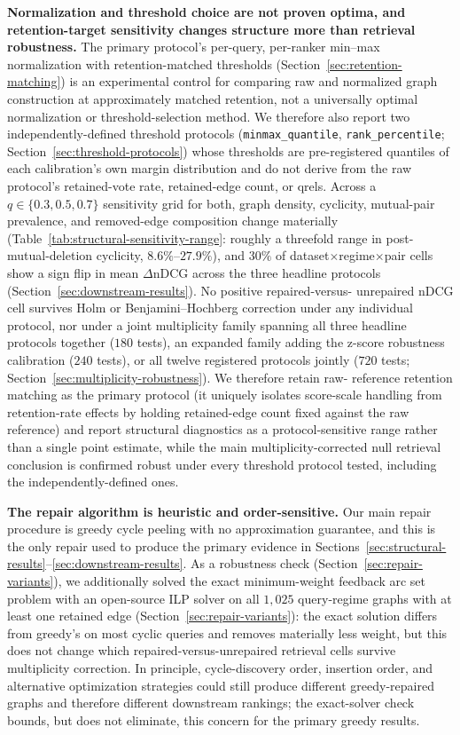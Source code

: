 \documentclass[manuscript,anonymous,review]{acmart}
\begin{document}
\textbf{Normalization and threshold choice are not proven optima, and
retention-target sensitivity changes structure more than retrieval
robustness.} The primary protocol's per-query, per-ranker min--max
normalization with retention-matched thresholds
(Section~\ref{sec:retention-matching}) is an experimental control for
comparing raw and normalized graph construction at approximately matched
retention, not a universally optimal normalization or threshold-selection
method. We therefore also report two independently-defined threshold protocols
(\texttt{minmax\_quantile}, \texttt{rank\_percentile};
Section~\ref{sec:threshold-protocols}) whose thresholds are pre-registered
quantiles of each calibration's own margin distribution and do not derive
from the raw protocol's retained-vote rate, retained-edge count, or qrels.
Across a $q\in\{0.3,0.5,0.7\}$ sensitivity grid for both, graph density,
cyclicity, mutual-pair prevalence, and removed-edge composition change
materially (Table~\ref{tab:structural-sensitivity-range}: roughly a
threefold range in post-mutual-deletion cyclicity, $8.6\%$--$27.9\%$), and
$30\%$ of dataset$\times$regime$\times$pair cells show a sign flip in mean
$\Delta$nDCG across the three headline protocols
(Section~\ref{sec:downstream-results}). No positive repaired-versus-
unrepaired nDCG cell survives Holm or Benjamini--Hochberg correction under
any individual protocol, nor under a joint multiplicity family spanning all
three headline protocols together ($180$ tests), an expanded family adding
the z-score robustness calibration ($240$ tests), or all twelve registered
protocols jointly ($720$ tests;
Section~\ref{sec:multiplicity-robustness}). We therefore retain raw-
reference retention matching as the primary protocol (it uniquely isolates
score-scale handling from retention-rate effects by holding retained-edge
count fixed against the raw reference) and report structural diagnostics as
a protocol-sensitive range rather than a single point estimate, while the
main multiplicity-corrected null retrieval conclusion is confirmed robust
under every threshold protocol tested, including the independently-defined
ones.

\textbf{The repair algorithm is heuristic and order-sensitive.} Our main repair
procedure is greedy cycle peeling with no approximation guarantee, and this is
the only repair used to produce the primary evidence in
Sections~\ref{sec:structural-results}--\ref{sec:downstream-results}. As a
robustness check (Section~\ref{sec:repair-variants}), we additionally solved
the exact minimum-weight feedback arc set problem with an open-source ILP
solver on all $1{,}025$ query-regime graphs with at least one retained edge
(Section~\ref{sec:repair-variants}): the exact solution
differs from greedy's on most cyclic queries and removes materially less
weight, but this does not change which repaired-versus-unrepaired retrieval
cells survive multiplicity correction. In principle, cycle-discovery order,
insertion order, and alternative optimization strategies could still produce
different greedy-repaired graphs and therefore different downstream rankings;
the exact-solver check bounds, but does not eliminate, this concern for the
primary greedy results.
\end{document}
